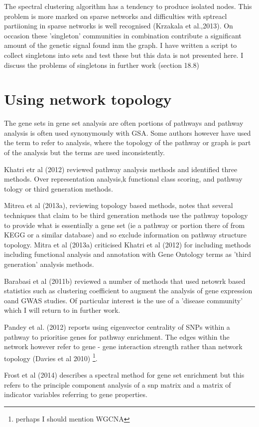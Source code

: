The spectral clustering algorithm has a tendency to produce isolated nodes. This problem is more marked on sparse networks and difficulties with sptreacl partiioning in sparse networks is well recognised (Krzakala et al.,2013). On occasion these 'singleton' communities in combination contribute a significant amount of the genetic signal found inm the graph. I have written a script to collect singletons into sets and test these but this data is not presented here. I discuss the problems of singletons in further work (section 18.8)

\section{Using network topology}

The gene sets in gene set analysis are often portions of pathways and pathway analysis is often used synonymously with GSA. Some authors however have used the term to refer to analysis, where the topology of the pathway or graph is part of the analysis but the terms are used inconsistently.

Khatri etr al (2012) reviewed pathway analysis methods and identified three methods. Over representation analysis,k functional class scoring, and pathway tology or third generation methods.

Mitrea et al (2013a), reviewing topology based methods, notes that several techniques that claim to be third generation methods use the pathway topology to provide what is essentially a gene set (ie a pathway or portion there of from KEGG or a similar database) and so exclude information on pathway structure topology. Mitra et al (2013a) criticised Khatri et al (2012) for including methods including functional analysis and annotation with Gene Ontology terms as 'third generation' analysis methods.

Barabasi et al (2011b) reviewed a number of methods that used netowrk based statistics such as clustering coefficient to augment the analysis of gene expression oand GWAS studies. Of particular interest is the use of a 'disease community' which I will return to in further work. 

Pandey et al. (2012) reports using eigenvector centrality of SNPs within a pathway to prioritise genes for pathway enrichment. The edges within the network however refer to gene - gene interaction strength rather than network topology (Davies et al 2010) \footnote{perhaps I should mention WGCNA}.

Frost et al (2014) describes a spectral method for gene set enrichment but this refers to the principle component analysis of a snp matrix and a matrix of indicator variables referring to gene properties.

